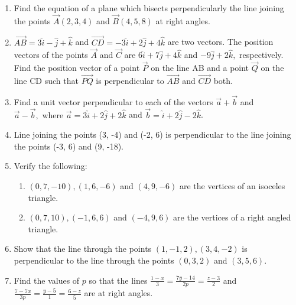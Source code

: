 \begin{enumerate}[label=\thesubsection.\arabic*, ref=\thesubsection.\theenumi]
\item Find the equation of a plane which  bisects perpendicularly the line joining the points $\vec{A}(2, 3, 4)$ and $\vec{B}(4, 5, 8)$ at right angles.
\item $\overrightarrow{AB}=3\hat{i}-\hat{j}+\hat{k}$ and $\overrightarrow{CD}=-3\hat{i}+2\hat{j}+4\hat{k}$ are two vectors. The position vectors of the points $\vec{A}$ and $\vec{C}$ are $6\hat{i}+7\hat{j}+4\hat{k}$ and $-9\hat{j}+2\hat{k}, $ respectively. Find the position vector of a point $\vec{P}$ on the line AB and a point $\vec{Q}$ on the line CD such that $\overrightarrow{PQ}$ is perpendicular to $\overrightarrow{AB}$ and $\overrightarrow{CD}$ both.
\item Find a unit vector perpendicular to each of the vectors $\overrightarrow{a}+\overrightarrow{b}$ and $\overrightarrow{a}-\overrightarrow{b}, \text{ where } \overrightarrow{a}=3\hat{i}+2\hat{j}+2\hat{k}$ and $ \overrightarrow{b}=\hat{i}+2\hat{j}-2\hat{k}$. 
	\\
		\solution
		
\item Line joining the points (3, -4) and (-2, 6) is perpendicular to the line joining the points (-3, 6) and (9, -18).
\item Verify the following:
\begin{enumerate}
\item $(0, 7, -10),  (1, 6, -6)$ and $(4, 9, -6)$ are the vertices of an isoceles triangle.
\item $(0, 7, 10),  (-1, 6, 6)$ and $(-4, 9, 6)$ are the vertices of a right angled triangle.
\end{enumerate}
\item  Show that the line through the points $(1, -1, 2), (3, 4, -2 )$ is perpendicular to the line through the points $(0, 3, 2)$ and $(3, 5, 6)$.
\item Find the values of $p$ so that the lines $ \frac{1-x}{3}=\frac{7y-14}{2p}=\frac{z-3}{2}$ and $ \frac{7-7x}{3p}=\frac{y-5}{1}=\frac{6-z}{5}$ are at right angles.
\end{enumerate}
